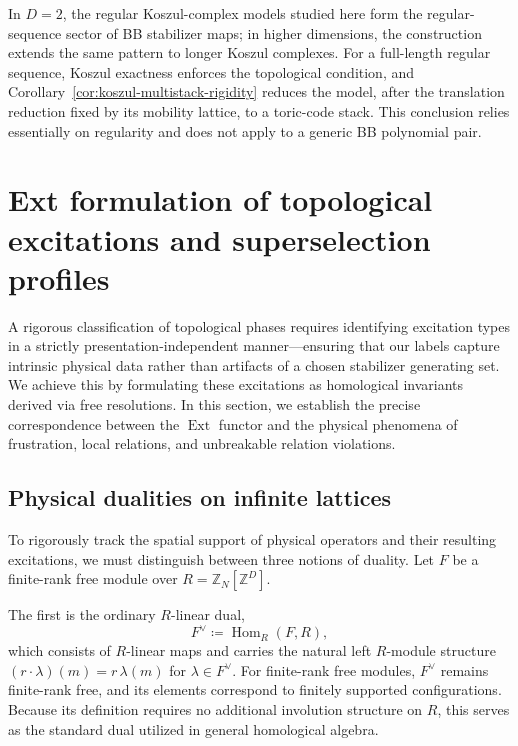 \documentclass[aps,prx,english,superscriptaddress,twocolumn,tightenlines,showpacs,longbibliography,floatfix,amsfonts]{revtex4-2}
\theoremstyle{remark}
\theoremstyle{definition}
\begin{document}
In \(D=2\), the regular Koszul-complex models studied here form the
regular-sequence sector of BB stabilizer maps; in higher dimensions, the
construction extends the same pattern to longer Koszul complexes. For a
full-length regular sequence, Koszul exactness enforces the topological
condition, and Corollary~\ref{cor:koszul-multistack-rigidity} reduces the model,
after the translation reduction fixed by its mobility lattice, to a
toric-code stack. This conclusion relies essentially on regularity and does
not apply to a generic BB polynomial pair.


\section{Ext formulation of topological excitations and superselection profiles}
\label{sec:ext-excitation-framework}

A rigorous classification of topological phases requires identifying excitation types in a strictly presentation-independent manner—ensuring that our labels capture intrinsic physical data rather than artifacts of a chosen stabilizer generating set. We achieve this by formulating these excitations as homological invariants derived via free resolutions. In this section, we establish the precise correspondence between the $\operatorname{Ext}$ functor and the physical phenomena of frustration, local relations, and unbreakable relation violations.

\subsection{Physical dualities on infinite lattices}
\label{subsec:physical-dualities}

To rigorously track the spatial support of physical operators and their resulting excitations, we must distinguish between three notions of duality. Let $F$ be a finite-rank free module over $R = \mathbb{Z}_N[\mathbb{Z}^D]$.

The first is the ordinary $R$-linear dual,
\begin{equation}
	F^\vee
	\coloneqq
	\operatorname{Hom}_R(F,R),
	\label{eq:R-dual}
\end{equation}
which consists of $R$-linear maps and carries the natural left $R$-module structure $(r\cdot \lambda)(m)=r\,\lambda(m)$ for $\lambda\in F^\vee$. For finite-rank free modules, $F^\vee$ remains finite-rank free, and its elements correspond to finitely supported configurations. Because its definition requires no additional involution structure on $R$, this serves as the standard dual utilized in general homological algebra.
\end{document}
